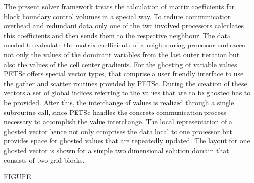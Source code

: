 The present solver framework treats the calculation of matrix coefficients for block boundary control volumes in a special way. To reduce communication overhead and redundant data only one of the two involved processors calculates this coefficients and then sends them to the respective neighbour. The data needed to calculate the matrix coefficients of a neighbouring processor embraces not only the values of the dominant variables from the last outer iteration but also the values of the cell center gradients. For the ghosting of variable values PETSc offers special vector types, that comprise a user friendly interface to use the gather and scatter routines provided by PETSc. During the creation of these vectors a set of global indices referring to the values that are to be ghosted has to be provided. After this, the interchange of values is realized through a single subroutine call, since PETSc handles the concrete communication process necessary to accomplish the value interchange. The local representation of a ghosted vector hence not only comprises the data local to one processor but provides space for ghosted values that are repeatedly updated. The layout for one ghosted vector is shown for a simple two dimensional solution domain that consists of two grid blocks.

FIGURE



